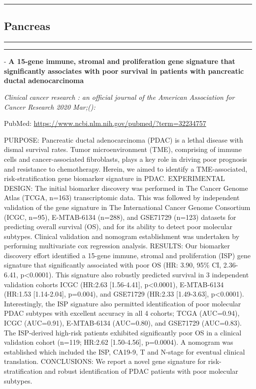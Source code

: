 \documentclass[
]{article}
\begin{document}
\begin{center}\rule{0.5\linewidth}{0.5pt}\end{center}

\pagebreak

\hypertarget{pancreas}{%
\subsection{Pancreas}\label{pancreas}}

\begin{center}\rule{0.5\linewidth}{0.5pt}\end{center}

\begin{center}\rule{0.5\linewidth}{0.5pt}\end{center}

- \textbf{A 15-gene immune, stromal and proliferation gene signature
that significantly associates with poor survival in patients with
pancreatic ductal adenocarcinoma}

\emph{Clinical cancer research : an official journal of the American
Association for Cancer Research 2020 Mar;():}

PubMed: \url{https://www.ncbi.nlm.nih.gov/pubmed/?term=32234757}

PURPOSE: Pancreatic ductal adenocarcinoma (PDAC) is a lethal disease
with dismal survival rates. Tumor microenvironment (TME), comprising of
immune cells and cancer-associated fibroblasts, plays a key role in
driving poor prognosis and resistance to chemotherapy. Herein, we aimed
to identify a TME-associated, risk-stratification gene biomarker
signature in PDAC. EXPERIMENTAL DESIGN: The initial biomarker discovery
was performed in The Cancer Genome Atlas (TCGA, n=163) transcriptomic
data. This was followed by independent validation of the gene signature
in The International Cancer Genome Consortium (ICGC, n=95), E-MTAB-6134
(n=288), and GSE71729 (n=123) datasets for predicting overall survival
(OS), and for its ability to detect poor molecular subtypes. Clinical
validation and nomogram establishment was undertaken by performing
multivariate cox regression analysis. RESULTS: Our biomarker discovery
effort identified a 15-gene immune, stromal and proliferation (ISP) gene
signature that significantly associated with poor OS (HR: 3.90, 95\% CI,
2.36-6.41, p\textless0.0001). This signature also robustly predicted
survival in 3 independent validation cohorts ICGC (HR:2.63
{[}1.56-4.41{]}, p\textless0.0001), E-MTAB-6134 (HR:1.53
{[}1.14-2.04{]}, p=0.004), and GSE71729 (HR:2.33 {[}1.49-3.63{]},
p\textless0.0001). Interestingly, the ISP signature also permitted
identification of poor molecular PDAC subtypes with excellent accuracy
in all 4 cohorts; TCGA (AUC=0.94), ICGC (AUC=0.91), E-MTAB-6134
(AUC=0.80), and GSE71729 (AUC=0.83). The ISP-derived high-risk patients
exhibited significantly poor OS in a clinical validation cohort (n=119;
HR:2.62 {[}1.50-4.56{]}, p=0.0004). A nomogram was established which
included the ISP, CA19-9, T and N-stage for eventual clinical
translation. CONCLUSIONS: We report a novel gene signature for
risk-stratification and robust identification of PDAC patients with poor
molecular subtypes.
\end{document}
